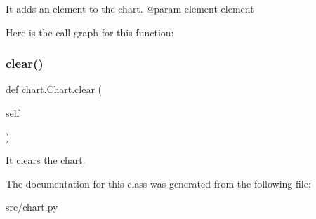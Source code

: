 \begin{DoxyVerb}It adds an element to the chart.
    @param element    element
\end{DoxyVerb}
 Here is the call graph for this function\+:
\mbox{\label{classchart_1_1_chart_a7152e6fb3985fdd1328c0a4ef3fd9322}} 
\subsubsection{\texorpdfstring{clear()}{clear()}}
{\footnotesize\ttfamily def chart.\+Chart.\+clear (\begin{DoxyParamCaption}\item[{}]{self }\end{DoxyParamCaption})}

\begin{DoxyVerb}It clears the chart.\end{DoxyVerb}
 

The documentation for this class was generated from the following file\+:\begin{DoxyCompactItemize}
\item 
src/chart.\+py\end{DoxyCompactItemize}
